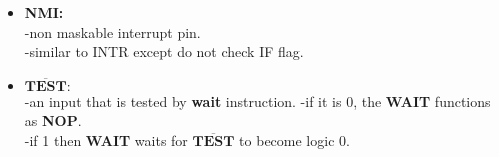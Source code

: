 \documentclass[12pt]{article}
\begin{document}
\begin{itemize}
\begin{itemize}
		\item\textbf{NMI:}\\
		-non maskable interrupt pin.\\
		-similar to INTR except do not check IF flag.\\
		
		\item$\overline{\textbf{TEST}}:$\\
		-an input that is tested by \textbf{wait} instruction.
		-if it is 0, the \textbf{WAIT} functions as \textbf{NOP}.\\
		-if 1 then \textbf{WAIT} waits for   $\overline{\textbf{TEST}}$ to become logic 0.\\
	\end{itemize}
\end{itemize}
\end{document}
